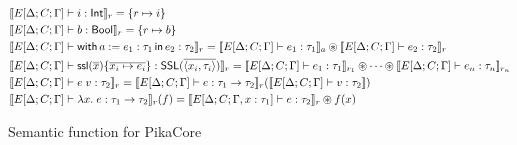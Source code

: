 \begin{figure}
\begin{center}
\end{center}
\begin{align*}
  &\sem{E[\Delta;C;\Gamma] \vdash i : \Int}_r = \{ r \mapsto i \}
  \\
  &\sem{E[\Delta;C;\Gamma] \vdash b : \Bool}_r = \{ r \mapsto b \}
  \\
  &\sem{E[\Delta;C;\Gamma] \vdash \withIn{a := e_1 : \tau_1} e_2 : \tau_2}_r = \sem{E[\Delta;C;\Gamma] \vdash e_1 : \tau_1}_a \osep \sem{E[\Delta;C;\Gamma] \vdash e_2 : \tau_2}_r
  \\
  &\sem{E[\Delta;C;\Gamma] \vdash \ssl{\overline{x}}{\overline{x_i \mapsto e_i}} : \SSL(\overline{\langle x_i, \tau_i \rangle})}_r =
    \sem{E[\Delta;C;\Gamma] \vdash e_1 : \tau_1}_{r_1} \osep \cdots \osep \sem{E[\Delta;C;\Gamma] \vdash e_n : \tau_n}_{r_n}
  \\
  &\sem{E[\Delta;C;\Gamma] \vdash e\; v : \tau_2}_r =
      \sem{E[\Delta;C;\Gamma] \vdash e : \tau_1 \ra \tau_2}_r(\sem{E[\Delta;C;\Gamma] \vdash v : \tau_2})
  \\
  &\sem{E[\Delta;C;\Gamma] \vdash \lambda x.\; e : \tau_1 \ra \tau_2}_r(f)
      = \sem{E[\Delta;C;\Gamma, x : \tau_1] \vdash e : \tau_2}_r \osep f(x)
\end{align*}
  \caption{Semantic function for PikaCore}
\end{figure}

%
%
%
%
